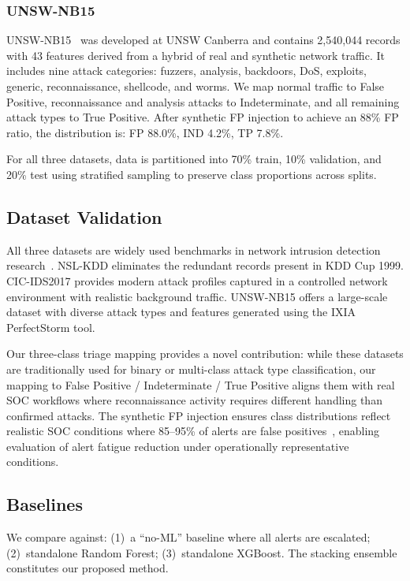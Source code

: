 \documentclass[conference]{IEEEtran}
\begin{document}
\subsubsection{UNSW-NB15}
UNSW-NB15~\cite{moustafa2015} was developed at UNSW Canberra and contains
2,540,044 records with 43 features derived from a hybrid of real and synthetic
network traffic. It includes nine attack categories: fuzzers, analysis, backdoors,
DoS, exploits, generic, reconnaissance, shellcode, and worms.
We map normal traffic to False Positive, reconnaissance and analysis attacks to
Indeterminate, and all remaining attack types to True Positive.
After synthetic FP injection to achieve an 88\% FP ratio, the distribution is:
FP 88.0\%, IND 4.2\%, TP 7.8\%.

For all three datasets, data is partitioned into 70\% train, 10\% validation,
and 20\% test using stratified sampling to preserve class proportions across splits.

\subsection{Dataset Validation}
\label{sec:dataset_validation}

All three datasets are widely used benchmarks in network intrusion detection
research~\cite{ring2019,tavallaee2009,sharafaldin2018,moustafa2015}.
NSL-KDD eliminates the redundant records present in KDD Cup 1999.
CIC-IDS2017 provides modern attack profiles captured in a controlled network
environment with realistic background traffic.
UNSW-NB15 offers a large-scale dataset with diverse attack types and
features generated using the IXIA PerfectStorm tool.

Our three-class triage mapping provides a novel contribution: while these
datasets are traditionally used for binary or multi-class attack type
classification, our mapping to False Positive / Indeterminate / True Positive
aligns them with real SOC workflows where reconnaissance activity requires
different handling than confirmed attacks.  The synthetic FP injection ensures
class distributions reflect realistic SOC conditions where 85--95\% of alerts
are false positives~\cite{alahmadi2020,tariq2025}, enabling evaluation of
alert fatigue reduction under operationally representative conditions.

\subsection{Baselines}
We compare against: (1)~a ``no-ML'' baseline where all alerts are escalated;
(2)~standalone Random Forest; (3)~standalone XGBoost.
The stacking ensemble constitutes our proposed method.
\end{document}
